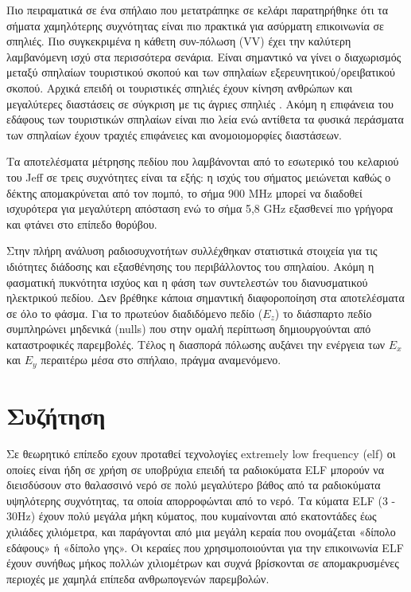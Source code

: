 \documentclass[12pt, greek]{article}
\begin{document}
\begin{multicols*}{2}
        Πιο πειραματικά σε ένα σπήλαιο που μετατράπηκε σε κελάρι \cite{soo_propagation_2018}
        παρατηρήθηκε ότι τα σήματα χαμηλότερης συχνότητας είναι πιο πρακτικά για ασύρματη
        επικοινωνία σε σπηλιές. Πιο συγκεκριμένα η κάθετη συν-πόλωση (VV) έχει την καλύτερη
        λαμβανόμενη ισχύ στα περισσότερα σενάρια.
        Είναι σημαντικό να γίνει ο διαχωρισμός μεταξύ σπηλαίων τουριστικού σκοπού και των σπηλαίων
        εξερευνητικού/ορειβατικού σκοπού. Αρχικά επειδή οι τουριστικές σπηλιές έχουν κίνηση ανθρώπων
        και μεγαλύτερες διαστάσεις σε σύγκριση με τις άγριες σπηλιές \cite{soo_propagation_2018}.
        Ακόμη η επιφάνεια του εδάφους των τουριστικών σπηλαίων είναι πιο λεία ενώ αντίθετα τα φυσικά
        περάσματα των σπηλαίων έχουν τραχιές επιφάνειες και ανομοιομορφίες διαστάσεων.

        Τα αποτελέσματα μέτρησης πεδίου που λαμβάνονται από το εσωτερικό του κελαριού του
        Jeff \cite{soo_propagation_2018} σε τρεις συχνότητες είναι τα εξής: η ισχύς του σήματος
        μειώνεται καθώς ο δέκτης απομακρύνεται από τον πομπό, το σήμα 900 MHz μπορεί να διαδοθεί
        ισχυρότερα για μεγαλύτερη απόσταση ενώ το σήμα 5,8 GHz εξασθενεί πιο γρήγορα και φτάνει στο 
        επίπεδο θορύβου.

        Στην πλήρη ανάλυση ραδιοσυχνοτήτων \cite{pingenot_full_2005} συλλέχθηκαν στατιστικά στοιχεία
        για τις ιδιότητες διάδοσης και εξασθένησης του περιβάλλοντος του σπηλαίου. Ακόμη η φασματική
        πυκνότητα ισχύος και η φάση των συντελεστών του διανυσματικού ηλεκτρικού πεδίου. Δεν βρέθηκε
        κάποια σημαντική διαφοροποίηση στα αποτελέσματα σε όλο το φάσμα. Για το πρωτεύον διαδιδόμενο
        πεδίο ($E_z$) το διάσπαρτο πεδίο συμπληρώνει μηδενικά (nulls) που στην ομαλή περίπτωση 
        δημιουργούνται από καταστροφικές παρεμβολές. Τέλος η διασπορά πόλωσης αυξάνει την ενέργεια
        των $E_x$ και $E_y$ περαιτέρω μέσα στο σπήλαιο, πράγμα αναμενόμενο.

    \section{\normalsize  \textsf{Συζήτηση}}
        Σε θεωρητικό επίπεδο εχουν προταθεί τεχνολογίες extremely low frequency
        (elf) οι οποίες είναι ήδη σε χρήση σε υποβρύχια επειδή τα ραδιοκύματα ELF μπορούν να
        διεισδύσουν στο θαλασσινό νερό σε πολύ μεγαλύτερο βάθος από τα ραδιοκύματα υψηλότερης
        συχνότητας, τα οποία απορροφώνται από το νερό. Τα κύματα ELF (3 - 30Hz) έχουν πολύ
        μεγάλα μήκη κύματος, που κυμαίνονται από εκατοντάδες έως χιλιάδες χιλιόμετρα, και
        παράγονται από μια μεγάλη κεραία που ονομάζεται «δίπολο εδάφους» ή «δίπολο γης». Οι
        κεραίες που χρησιμοποιούνται για την επικοινωνία ELF έχουν συνήθως μήκος πολλών
        χιλιομέτρων και συχνά βρίσκονται σε απομακρυσμένες περιοχές με χαμηλά επίπεδα
        ανθρωπογενών παρεμβολών.


\end{multicols*}
\end{document}
